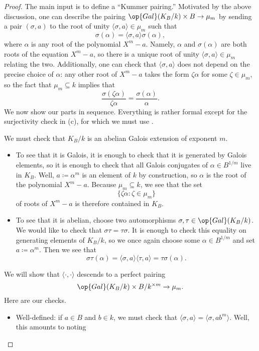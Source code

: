 \documentclass[../notes.tex]{subfiles}
\begin{document}
\begin{proof}
	The main input is to define a ``Kummer pairing.'' Motivated by the above discussion, one can describe the pairing $\op{Gal}(K_B/k)\times B\to\mu_m$ by sending a pair $(\sigma,a)$ to the root of unity $\langle\sigma,a\rangle\in\mu_m$ such that
	\[\sigma(\alpha)=\langle\sigma,a\rangle\sigma(\alpha),\]
	where $\alpha$ is any root of the polynomial $X^m-a$. Namely, $\alpha$ and $\sigma(\alpha)$ are both roots of the equation $X^m-a$, so there is a unique root of unity $\langle\sigma,a\rangle\in\mu_m$ relating the two. Additionally, one can check that $\langle\sigma,a\rangle$ does not depend on the precise choice of $\alpha$: any other root of $X^m-a$ takes the form $\zeta\alpha$ for some $\zeta\in\mu_m$, so the fact that $\mu_m\subseteq k$ implies that
	\[\frac{\sigma(\zeta\alpha)}{\zeta\alpha}=\frac{\sigma(\alpha)}{\alpha}.\]
	We now show our parts in sequence. Everything is rather formal except for the surjectivity check in (c), for which we must use .
	\begin{listalph}
		\item We must check that $K_B/k$ is an abelian Galois extension of exponent $m$.
		\begin{itemize}
			\item To see that it is Galois, it is enough to check that it is generated by Galois elements, so it is enough to check that all Galois conjugates of $\alpha\in B^{1/m}$ live in $K_B$. Well, $a\coloneqq\alpha^m$ is an element of $k$ by construction, so $\alpha$ is the root of the polynomial $X^m-a$. Because $\mu_m\subseteq k$, we see that the set
			\[\{\zeta\alpha:\zeta\in\mu_m\}\]
			of roots of $X^m-a$ is therefore contained in $K_B$. 
			\item To see that it is abelian, choose two automorphisms $\sigma,\tau\in\op{Gal}(K_B/k)$. We would like to check that $\sigma\tau=\tau\sigma$. It is enough to check this equality on generating elements of $K_B/k$, so we once again choose some $\alpha\in B^{1/m}$ and set $a\coloneqq\alpha^m$. Then we see that
			\[\sigma\tau(\alpha)=\langle\sigma,a\rangle\langle\tau,a\rangle=\tau\sigma(\alpha).\]
		\end{itemize}
		\item We will show that $\langle\cdot,\cdot\rangle$ descends to a perfect pairing
		\[\op{Gal}(K_B/k)\times B/k^{\times m}\to\mu_m.\]
		Here are our checks.
		\begin{itemize}
			\item Well-defined: if $a\in B$ and $b\in k$, we must check that $\langle\sigma,a\rangle=\langle\sigma,ab^m\rangle$. Well, this amounts to noting

\end{itemize}
\end{listalph}
\end{proof}
\end{document}
